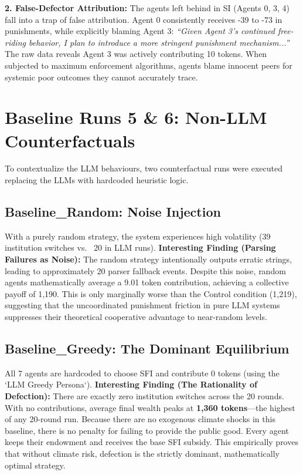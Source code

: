 \documentclass[11pt,a4paper]{article}
\begin{document}
\textbf{2. False-Defector Attribution:}
The agents left behind in SI (Agents 0, 3, 4) fall into a trap of false attribution. Agent 0 consistently receives -39 to -73 in punishments, while explicitly blaming Agent 3: \textit{``Given Agent 3's continued free-riding behavior, I plan to introduce a more stringent punishment mechanism...''} The raw data reveals Agent 3 was actively contributing 10 tokens. When subjected to maximum enforcement algorithms, agents blame innocent peers for systemic poor outcomes they cannot accurately trace.

\section{Baseline Runs 5 \& 6: Non-LLM Counterfactuals}

To contextualize the LLM behaviours, two counterfactual runs were executed replacing the LLMs with hardcoded heuristic logic.

\subsection{Baseline\_Random: Noise Injection}
With a purely random strategy, the system experiences high volatility (39 institution switches vs. ~20 in LLM runs). 
\textbf{Interesting Finding (Parsing Failures as Noise):} The random strategy intentionally outputs erratic strings, leading to approximately 20 parser fallback events. Despite this noise, random agents mathematically average a 9.01 token contribution, achieving a collective payoff of 1,190. This is only marginally worse than the Control condition (1,219), suggesting that the uncoordinated punishment friction in pure LLM systems suppresses their theoretical cooperative advantage to near-random levels.

\subsection{Baseline\_Greedy: The Dominant Equilibrium}
All 7 agents are hardcoded to choose SFI and contribute 0 tokens (using the `LLM Greedy Persona`). 
\textbf{Interesting Finding (The Rationality of Defection):} 
There are exactly zero institution switches across the 20 rounds. With no contributions, average final wealth peaks at \textbf{1,360 tokens}—the highest of any 20-round run. Because there are no exogenous climate shocks in this baseline, there is no penalty for failing to provide the public good. Every agent keeps their endowment and receives the base SFI subsidy. This empirically proves that without climate risk, defection is the strictly dominant, mathematically optimal strategy. 
\end{document}
